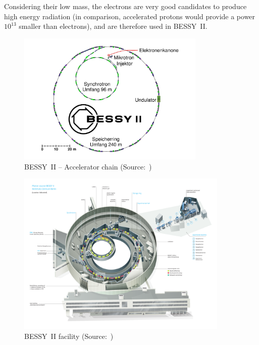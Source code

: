 Considering their low mass, the electrons are very good candidates to produce high energy radiation (in comparison, accelerated protons would provide a power $10^{13}$ smaller than electrons), and are therefore used in BESSY~II.

\begin{figure}
    \centering
    \includegraphics[width=0.8\textwidth]{img/bessy_acc_chain_web.jpg}
    \caption[BESSY~II -- Accelerator chain]{\label{fig:bessy_acc_web_simple} BESSY~II -- Accelerator chain (Source:~\cite{web:bessy_homepage})}
\end{figure}

\begin{figure}
    \centering
    \includegraphics[width=0.9\textwidth,height=1\textheight,keepaspectratio]{img/bessy_acc_web.pdf}
    \caption[BESSY~II facility]{\label{fig:bessy_acc_web} BESSY~II facility (Source:~\cite{web:bessy_homepage})}
\end{figure}

